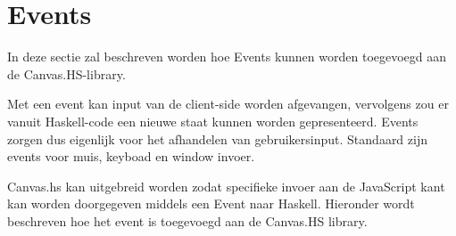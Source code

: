 \section{Events}
In deze sectie zal beschreven worden hoe Events kunnen worden toegevoegd aan de Canvas.HS-library.

Met een event kan input van de client-side worden afgevangen, vervolgens zou er vanuit Haskell-code een nieuwe staat kunnen worden gepresenteerd. Events zorgen dus eigenlijk voor het afhandelen van gebruikersinput. Standaard zijn events voor muis, keyboad en window invoer.

Canvas.hs kan uitgebreid worden zodat specifieke invoer aan de JavaScript kant kan worden doorgegeven middels een Event naar Haskell. Hieronder wordt beschreven hoe het  event is toegevoegd aan de Canvas.HS library.
